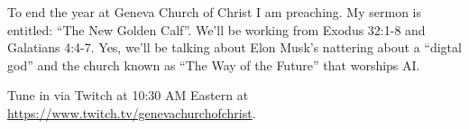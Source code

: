To end the year at Geneva Church of Christ I am preaching. My sermon is
entitled: ``The New Golden Calf''. We'll be working from Exodus 32:1-8
and Galatians 4:4-7. Yes, we'll be talking about Elon Musk's nattering
about a ``digtal god'' and the church known as ``The Way of the Future''
that worships AI.

Tune in via Twitch at 10:30 AM Eastern at
\url{https://www.twitch.tv/genevachurchofchrist}.
